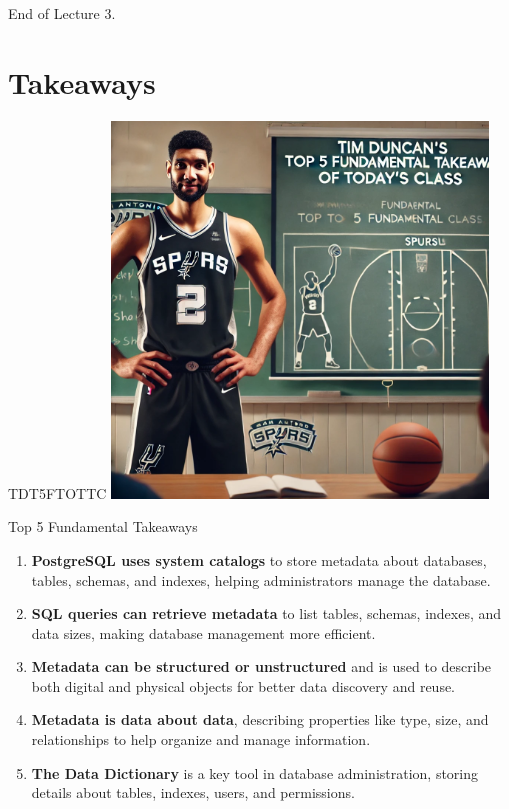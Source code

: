 \documentclass{beamer}
\begin{document}
\begin{frame}{}
    \centering
    \Huge End of Lecture 3.
\end{frame}

\section*{Takeaways}

\begin{frame}{TDT5FTOTTC}
    \centering
    \includegraphics[width=0.75\textwidth]{figures/tim.png}
\end{frame}

\begin{frame}{Top 5 Fundamental Takeaways}
    \begin{enumerate} \pause
        \item[5] \textbf{PostgreSQL uses system catalogs} to store metadata about databases, tables, schemas, and indexes, helping administrators manage the database.\pause
        \item[4] \textbf{SQL queries can retrieve metadata} to list tables, schemas, indexes, and data sizes, making database management more efficient.\pause
        \item[3] \textbf{Metadata can be structured or unstructured} and is used to describe both digital and physical objects for better data discovery and reuse.\pause
        \item[2] \textbf{Metadata is data about data}, describing properties like type, size, and relationships to help organize and manage information.\pause
        \item[1] \textbf{The Data Dictionary} is a key tool in database administration, storing details about tables, indexes, users, and permissions.
        \end{enumerate}
\end{frame}
\end{document}
